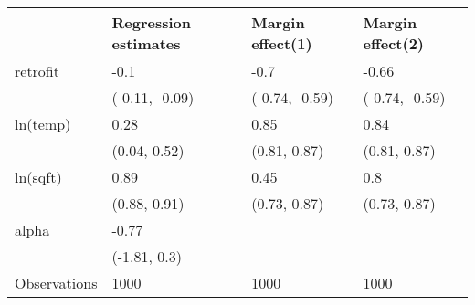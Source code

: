 \begin{tabular}{llll}
\toprule
{} & Regression estimates & Margin effect(1) & Margin effect(2) \\
\midrule
retrofit     &                 -0.1 &             -0.7 &            -0.66 \\
             &       (-0.11, -0.09) &   (-0.74, -0.59) &   (-0.74, -0.59) \\
ln(temp)     &                 0.28 &             0.85 &             0.84 \\
             &         (0.04, 0.52) &     (0.81, 0.87) &     (0.81, 0.87) \\
ln(sqft)     &                 0.89 &             0.45 &              0.8 \\
             &         (0.88, 0.91) &     (0.73, 0.87) &     (0.73, 0.87) \\
alpha        &                -0.77 &                  &                  \\
             &         (-1.81, 0.3) &                  &                  \\
Observations &                 1000 &             1000 &             1000 \\
\bottomrule
\end{tabular}
